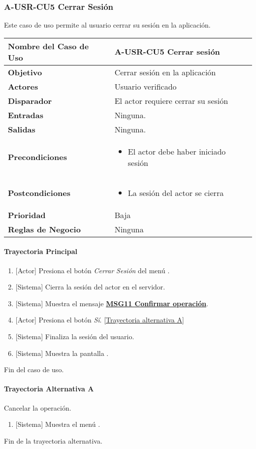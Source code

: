 \subsubsection{A-USR-CU5 Cerrar Sesión}
Este caso de uso permite al usuario cerrar su sesión en la aplicación.

\begin{longtable}{|J{5cm}|J{10.3cm}|}
	\hline
	\textbf{Nombre del Caso de Uso} &
		A-USR-CU5 Cerrar sesión \\ \hline
	\textbf{Objetivo} &
		Cerrar sesión en la aplicación \\ \hline
	\textbf{Actores} &
		Usuario verificado \\ \hline 
	\textbf{Disparador} & 
		El actor requiere cerrar su sesión \\ \hline 
	\textbf{Entradas} & 
		Ninguna. \\ \hline 
	\textbf{Salidas} & 
		Ninguna. \\ \hline
	\textbf{Precondiciones} &
		\begin{itemize}
		    \item El actor debe haber iniciado sesión
		\end{itemize} \\ \hline
	\textbf{Postcondiciones} &
        \begin{itemize}
		    \item La sesión del actor se cierra
		\end{itemize} \\ \hline
	\textbf{Prioridad} & 
		Baja \\ \hline
	\textbf{Reglas de Negocio} & 
		Ninguna \\ \hline

\end{longtable}

\paragraph{Trayectoria Principal}
\label{CUA_Cerrar_Sesion}
	\begin{enumerate}
	    \item {[Actor]} Presiona el botón \textit{Cerrar Sesión} del menú \textbf{}.
	    \item {[Sistema]} Cierra la sesión del actor en el servidor.
	    \item {[Sistema]} Muestra el mensaje \hyperref[MSG11]{\bf MSG11 Confirmar operación}.
	    \item {[Actor]} Presiona el botón \textit{Sí}. \hyperref[A-USR-CU5:TA]{[Trayectoria alternativa A]}
	    \item {[Sistema]} Finaliza la sesión del usuario.
	    \item {[Sistema]} Muestra la pantalla \textbf{}.
	\end{enumerate}
	Fin del caso de uso.

\paragraph{Trayectoria Alternativa A} \label{A-USR-CU5:TA}
    Cancelar la operación.
	\begin{enumerate}[label=A\arabic*.]
		\item {[Sistema]} Muestra el menú \textbf{}.
	\end{enumerate}
	Fin de la trayectoria alternativa.